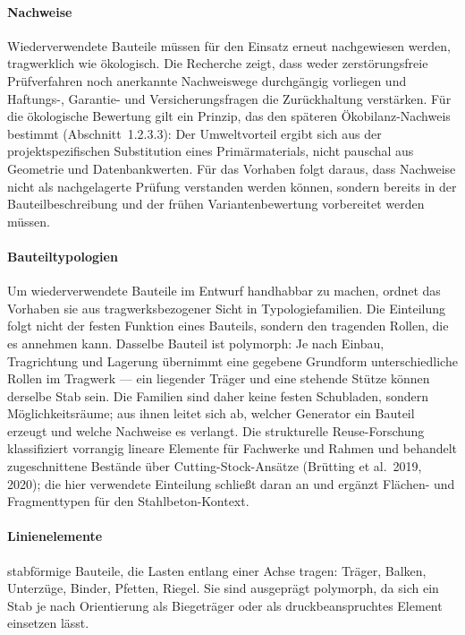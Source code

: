 \documentclass[type=zwischenbericht]{zukunftbau}
\begin{document}
\begin{SemioNest}
\begin{SemioNest}
\paragraph{Nachweise}
Wiederverwendete Bauteile müssen für den Einsatz erneut nachgewiesen werden, tragwerklich wie ökologisch. Die Recherche zeigt, dass weder zerstörungsfreie Prüfverfahren noch anerkannte Nachweiswege durchgängig vorliegen und Haftungs-, Garantie- und Versicherungsfragen die Zurückhaltung verstärken. Für die ökologische Bewertung gilt ein Prinzip, das den späteren Ökobilanz-Nachweis bestimmt (Abschnitt~1.2.3.3): Der Umweltvorteil ergibt sich aus der projektspezifischen Substitution eines Primärmaterials, nicht pauschal aus Geometrie und Datenbankwerten. Für das Vorhaben folgt daraus, dass Nachweise nicht als nachgelagerte Prüfung verstanden werden können, sondern bereits in der Bauteilbeschreibung und der frühen Variantenbewertung vorbereitet werden müssen.
\end{SemioNest}

\paragraph{Bauteiltypologien}
Um wiederverwendete Bauteile im Entwurf handhabbar zu machen, ordnet das Vorhaben sie aus tragwerksbezogener Sicht in Typologiefamilien. Die Einteilung folgt nicht der festen Funktion eines Bauteils, sondern den tragenden Rollen, die es annehmen kann. Dasselbe Bauteil ist polymorph: Je nach Einbau, Tragrichtung und Lagerung übernimmt eine gegebene Grundform unterschiedliche Rollen im Tragwerk --- ein liegender Träger und eine stehende Stütze können derselbe Stab sein. Die Familien sind daher keine festen Schubladen, sondern Möglichkeitsräume; aus ihnen leitet sich ab, welcher Generator ein Bauteil erzeugt und welche Nachweise es verlangt. Die strukturelle Reuse-Forschung klassifiziert vorrangig lineare Elemente für Fachwerke und Rahmen und behandelt zugeschnittene Bestände über Cutting-Stock-Ansätze (Brütting et al.\ 2019, 2020); die hier verwendete Einteilung schließt daran an und ergänzt Flächen- und Fragmenttypen für den Stahlbeton-Kontext.

\begin{SemioNest}
\paragraph{Linienelemente}
stabförmige Bauteile, die Lasten entlang einer Achse tragen: Träger, Balken, Unterzüge, Binder, Pfetten, Riegel. Sie sind ausgeprägt polymorph, da sich ein Stab je nach Orientierung als Biegeträger oder als druckbeanspruchtes Element einsetzen lässt.


\end{SemioNest}
\end{SemioNest}
\end{document}
